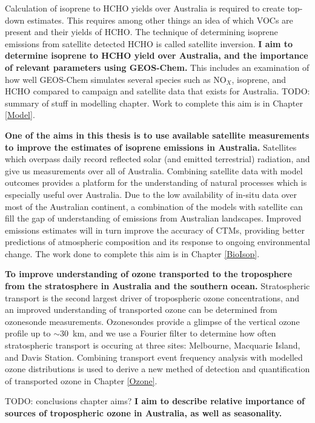   Calculation of isoprene to HCHO yields over Australia is required to create top-down estimates.
  This requires among other things an idea of which VOCs are present and their yields of HCHO.
  The technique of determining isoprene emissions from satellite detected HCHO is called satellite inversion.
  \textbf{I aim to determine isoprene to HCHO yield over Australia, and the importance of relevant parameters using GEOS-Chem.}
  This includes an examination of how well GEOS-Chem simulates several species such as NO$_X$, isoprene, and HCHO compared to campaign and satellite data that exists for Australia.
  TODO: summary of stuff in modelling chapter.
  Work to complete this aim is in Chapter \ref{Model}.
  
  \textbf{One of the aims in this thesis is to use available satellite measurements to improve the estimates of isoprene emissions in Australia.}
  Satellites which overpass daily record reflected solar (and emitted terrestrial) radiation, and give us measurements over all of Australia.
  Combining satellite data with model outcomes provides a platform for the understanding of natural processes which is especially useful over Australia.
  Due to the low availability of in-situ data over most of the Australian continent, a combination of the models with satellite can fill the gap of understanding of emissions from Australian landscapes.
  Improved emissions estimates will in turn improve the accuracy of CTMs, providing better predictions of atmospheric composition and its response to ongoing environmental change.
  The work done to complete this aim is in Chapter \ref{BioIsop}.
  
  \textbf{To improve understanding of ozone transported to the troposphere from the stratosphere in Australia and the southern ocean.}
  Stratospheric transport is the second largest driver of tropospheric ozone concentrations, and an improved understanding of transported ozone can be determined from ozonesonde measurements.
  Ozonesondes provide a glimpse of the vertical ozone profile up to $\sim 30$~km, and we use a Fourier filter to determine how often stratospheric transport is occuring at three sites: Melbourne, Macquarie Island, and Davis Station. 
  Combining transport event frequency analysis with modelled ozone distributions is used to derive a new methed of detection and quantification of transported ozone in Chapter \ref{Ozone}.
  
  
  TODO: conclusions chapter aims? 
  \textbf{I aim to describe relative importance of sources of tropospheric ozone in Australia, as well as seasonality.}
  
